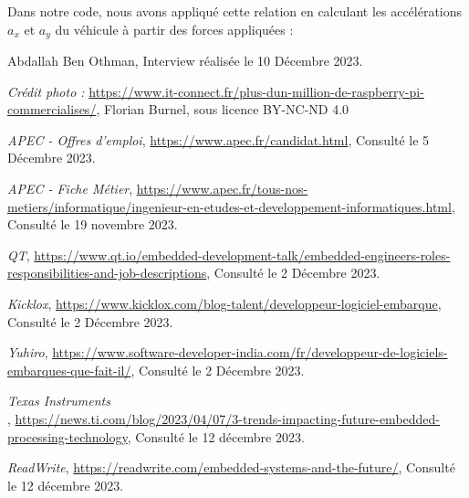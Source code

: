\documentclass[a4paper,12pt]{report}
\begin{document}
Dans notre code, nous avons appliqué cette relation en calculant les accélérations $a_x$ et $a_y$ du véhicule à partir des forces appliquées :






\begin{thebibliography}{99}
    Abdallah Ben Othman,
    Interview réalisée le 10 Décembre 2023.

    \emph{Crédit photo :}
    \url{https://www.it-connect.fr/plus-dun-million-de-raspberry-pi-commercialises/},
    Florian Burnel, sous licence BY-NC-ND 4.0

    \emph{APEC - Offres d'emploi},
    \url{https://www.apec.fr/candidat.html},
    Consulté le 5 Décembre 2023.

    \emph{APEC - Fiche Métier},
    \url{https://www.apec.fr/tous-nos-metiers/informatique/ingenieur-en-etudes-et-developpement-informatiques.html},
    Consulté le 19 novembre 2023.

    \emph{QT},
    \url{https://www.qt.io/embedded-development-talk/embedded-engineers-roles-responsibilities-and-job-descriptions},
    Consulté le 2 Décembre 2023.

    \emph{Kicklox},
    \url{https://www.kicklox.com/blog-talent/developpeur-logiciel-embarque},
    Consulté le 2 Décembre 2023.

    \emph{Yuhiro},
    \url{https://www.software-developer-india.com/fr/developpeur-de-logiciels-embarques-que-fait-il/},
    Consulté le 2 Décembre 2023.

    \emph{Texas Instruments\\},
    \url{https://news.ti.com/blog/2023/04/07/3-trends-impacting-future-embedded-processing-technology},
    Consulté le 12 décembre 2023.

    \emph{ReadWrite},
    \url{https://readwrite.com/embedded-systems-and-the-future/},
    Consulté le 12 décembre 2023.

\end{thebibliography}
\end{document}
